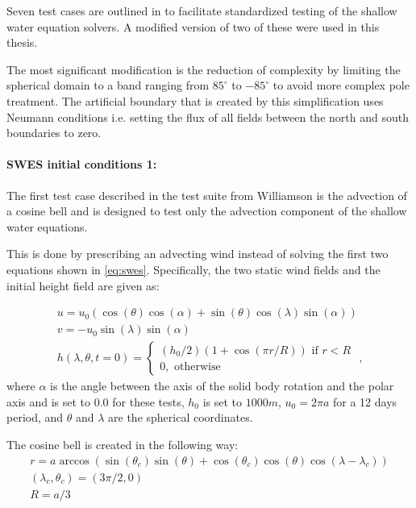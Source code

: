 Seven test cases are outlined in \citet{williamson1992standard} to facilitate standardized testing of the shallow water equation solvers.
A modified version of two of these were used in this thesis.

The most significant modification is the reduction of complexity by limiting the spherical domain to a band ranging from $85^\circ$ to $-85^\circ$ to avoid more complex pole treatment.
The artificial boundary that is created by this simplification uses Neumann conditions i.e. setting the flux of all fields between the north and south boundaries to zero.

\paragraph{SWES initial conditions 1:}
The first test case described in the test suite from Williamson is the advection of a cosine bell and is designed to test only the advection component of the shallow water equations.

This is done by prescribing an advecting wind instead of solving the first two equations shown in \ref{eq:swes}.
Specifically, the two static wind fields and the initial height field are given as:

\begin{equation}
\label{eq:swes_ic0}
\begin{split}
u = u_0 \left( \cos \left( \theta \right) \cos \left( \alpha \right) + \sin \left( \theta \right) \cos \left( \lambda \right) \sin \left( \alpha \right) \right)
\\
v = -u_0 \sin \left( \lambda \right) \sin \left( \alpha \right)
\\
h \left( \lambda, \theta, t=0 \right) =  \begin{cases}
\left(h_0 / 2 \right) \left( 1 + \cos \left( \pi r / R \right) \right) \text{ if } r < R \\
0, \text{ otherwise}
\end{cases}
\text{ ,}
\end{split}
\end{equation}
where $\alpha$ is the angle between the axis of the solid body rotation and the polar axis and is set to $0.0$ for these tests, $h_0$ is set to $1000 m$, $u_0 = 2 \pi a$ for a 12 days period, and $\theta$ and $\lambda$ are the spherical coordinates.

The cosine bell is created in the following way:
\begin{equation}
\label{eq:swes_cosine_bell}
\begin{split}
r = a \arccos \left( \sin \left( \theta_c \right) \sin \left( \theta \right) + \cos \left( \theta_c \right) \cos \left( \theta \right) \cos \left( \lambda - \lambda_c \right) \right)
\\
\left( \lambda_c, \theta_c \right) = \left( 3 \pi / 2, 0 \right)
\\
R = a / 3
\end{split}
\end{equation}


